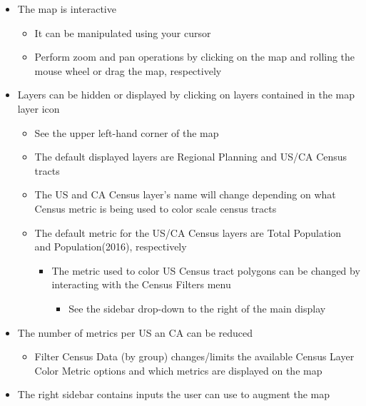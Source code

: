 \documentclass[
]{article}
\providecommand{\tightlist}{%
  \setlength{\itemsep}{0pt}\setlength{\parskip}{0pt}}
\begin{document}
\begin{itemize}
\tightlist
\item
  The map is interactive

  \begin{itemize}
  \tightlist
  \item
    It can be manipulated using your cursor
  \item
    Perform zoom and pan operations by clicking on the map and rolling
    the mouse wheel or drag the map, respectively
  \end{itemize}
\item
  Layers can be hidden or displayed by clicking on layers contained in
  the map layer icon

  \begin{itemize}
  \tightlist
  \item
    See the upper left-hand corner of the map
  \item
    The default displayed layers are Regional Planning and US/CA Census
    tracts
  \item
    The US and CA Census layer's name will change depending on what
    Census metric is being used to color scale census tracts
  \item
    The default metric for the US/CA Census layers are Total Population
    and Population(2016), respectively

    \begin{itemize}
    \tightlist
    \item
      The metric used to color US Census tract polygons can be changed
      by interacting with the Census Filters menu

      \begin{itemize}
      \tightlist
      \item
        See the sidebar drop-down to the right of the main display
      \end{itemize}
    \end{itemize}
  \end{itemize}
\item
  The number of metrics per US an CA can be reduced

  \begin{itemize}
  \tightlist
  \item
    Filter Census Data (by group) changes/limits the available Census
    Layer Color Metric options and which metrics are displayed on the
    map
  \end{itemize}
\item
  The right sidebar contains inputs the user can use to augment the map


\end{itemize}
\end{document}

